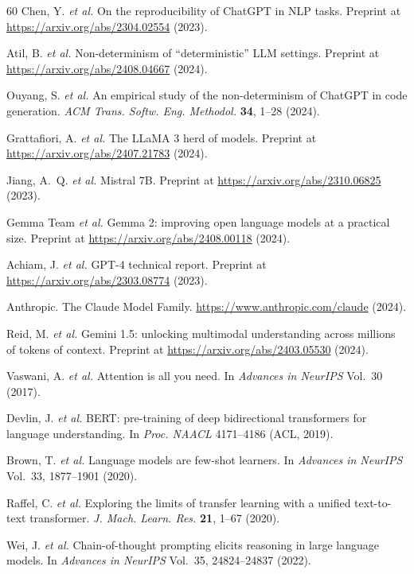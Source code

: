 \documentclass[sn-nature]{sn-jnl}
\begin{document}
\begin{thebibliography}{60}
Chen, Y. \emph{et al.}
On the reproducibility of ChatGPT in NLP tasks.
Preprint at \url{https://arxiv.org/abs/2304.02554} (2023).

Atil, B. \emph{et al.}
Non-determinism of ``deterministic'' LLM settings.
Preprint at \url{https://arxiv.org/abs/2408.04667} (2024).

Ouyang, S. \emph{et al.}
An empirical study of the non-determinism of ChatGPT in code generation.
\emph{ACM Trans. Softw. Eng. Methodol.} \textbf{34}, 1--28 (2024).

Grattafiori, A. \emph{et al.}
The LLaMA 3 herd of models.
Preprint at \url{https://arxiv.org/abs/2407.21783} (2024).

Jiang, A.~Q. \emph{et al.}
Mistral 7B.
Preprint at \url{https://arxiv.org/abs/2310.06825} (2023).

Gemma Team \emph{et al.}
Gemma 2: improving open language models at a practical size.
Preprint at \url{https://arxiv.org/abs/2408.00118} (2024).

Achiam, J. \emph{et al.}
GPT-4 technical report.
Preprint at \url{https://arxiv.org/abs/2303.08774} (2023).

Anthropic.
The Claude Model Family.
\url{https://www.anthropic.com/claude} (2024).

Reid, M. \emph{et al.}
Gemini 1.5: unlocking multimodal understanding across millions of tokens of context.
Preprint at \url{https://arxiv.org/abs/2403.05530} (2024).

Vaswani, A. \emph{et al.}
Attention is all you need.
In \emph{Advances in NeurIPS} Vol.~30 (2017).

Devlin, J. \emph{et al.}
BERT: pre-training of deep bidirectional transformers for language understanding.
In \emph{Proc. NAACL} 4171--4186 (ACL, 2019).

Brown, T. \emph{et al.}
Language models are few-shot learners.
In \emph{Advances in NeurIPS} Vol.~33, 1877--1901 (2020).

Raffel, C. \emph{et al.}
Exploring the limits of transfer learning with a unified text-to-text transformer.
\emph{J. Mach. Learn. Res.} \textbf{21}, 1--67 (2020).

Wei, J. \emph{et al.}
Chain-of-thought prompting elicits reasoning in large language models.
In \emph{Advances in NeurIPS} Vol.~35, 24824--24837 (2022).


\end{thebibliography}
\end{document}
